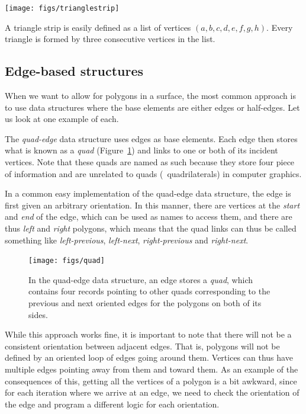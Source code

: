 \begin{marginfigure}
\centering
\texttt{[image: figs/trianglestrip]}
\caption[A triangle strip is easily defined as a list of vertices]{A triangle strip is easily defined as a list of vertices \((a,b,c,d,e,f,g,h)\). Every triangle is formed by three consecutive vertices in the list.}%
\label{fig:trianglestrip}
\end{marginfigure}

\subsection{Edge-based structures}

When we want to allow for polygons in a surface, the most common approach is to use data structures where the base elements are either edges or half-edges.
Let us look at one example of each.

The \emph{quad-edge} data structure uses edges as base elements.
Each edge then stores what is known as a \emph{quad} (Figure~\ref{fig:quad}) and links to one or both of its incident vertices.
Note that these quads are named as such because they store four piece of information and are unrelated to quads (\ie\ quadrilaterals) in computer graphics.

In a common easy implementation of the quad-edge data structure, the edge is first given an arbitrary orientation.
In this manner, there are vertices at the \emph{start} and \emph{end} of the edge, which can be used as names to access them, and there are thus \emph{left} and \emph{right} polygons, which means that the quad links can thus be called something like \emph{left-previous}, \emph{left-next}, \emph{right-previous} and \emph{right-next}.

\begin{figure}[b]
\centering
\texttt{[image: figs/quad]}
\caption[In the quad-edge data structure, an edge stores a \emph{quad}]{In the quad-edge data structure, an edge stores a \emph{quad}, which contains four records pointing to other quads corresponding to the previous and next oriented edges for the polygons on both of its sides.}%
\label{fig:quad}
\end{figure}

While this approach works fine, it is important to note that there will not be a consistent orientation between adjacent edges.
That is, polygons will not be defined by an oriented loop of edges going around them.
Vertices can thus have multiple edges pointing away from them and toward them.
As an example of the consequences of this, getting all the vertices of a polygon is a bit awkward, since for each iteration where we arrive at an edge, we need to check the orientation of the edge and program a different logic for each orientation.

